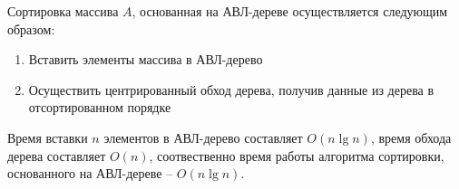 Сортировка массива $A$, основанная на АВЛ-дереве осуществляется следующим образом:
\begin{enumerate}
	\item{Вставить элементы массива в АВЛ-дерево}
	\item{Осуществить центрированный обход дерева\footnotemark, получив данные из дерева в отсортированном порядке}
\end{enumerate}


Время вставки $n$ элементов в АВЛ-дерево составляет $O(n\lg n)$, время обхода дерева составляет $O(n)$, соотвественно время работы алгоритма сортировки, основанного на АВЛ-дереве -- $O(n\lg n)$.

\newpage

